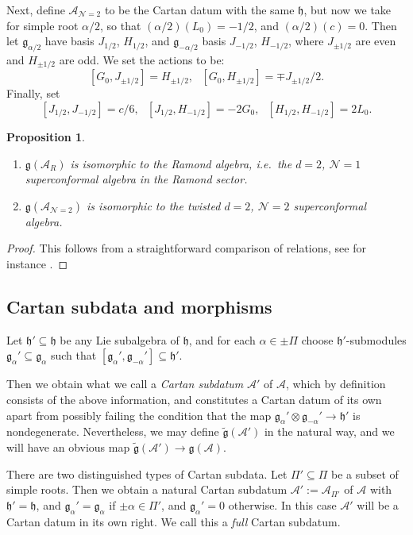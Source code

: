 \documentclass[12pt, a4paper, reqno]{amsart}
\def\AA{\mathcal{A}}
\def\NN{\mathcal{N}}
\def\g{\mathfrak{g}}
\def\h{\mathfrak{h}}
\newtheorem{proposition}{Proposition}
\theoremstyle{definition}
\theoremstyle{definition}
\theoremstyle{definition}
\numberwithin{theorem}{section}
\numberwithin{lemma}{section}
\numberwithin{remark}{section}
\numberwithin{definition}{section}
\numberwithin{corollary}{section}
\numberwithin{proposition}{section}
\numberwithin{example}{section}
\begin{document}
	Next, define $\AA_{\NN=2}$ to be the Cartan datum with the same $\h$,  but now we take for simple root $\alpha/2$, so that $(\alpha/2)(L_0)=-1/2$, and $(\alpha/2)(c)=0$.  Then let $\g_{\alpha/2}$ have basis $J_{1/2}$, $H_{1/2}$, and $\g_{-\alpha/2}$ basis $J_{-1/2}$, $H_{-1/2}$, where $J_{\pm1/2}$ are even and $H_{\pm1/2}$ are odd.  We set the actions to be:
	\[
	[G_0,J_{\pm1/2}]=H_{\pm 1/2}, \ \ \ [G_0,H_{\pm1/2}]=\mp J_{\pm1/2}/2.
	\]
	Finally, set 
	\[
	[J_{1/2},J_{-1/2}]=c/6, \ \ \ [J_{1/2},H_{-1/2}]=-2G_0, \ \ \ [H_{1/2},H_{-1/2}]=2L_0.
	\]
	
	\begin{proposition}
		\begin{enumerate}
			\item $\g(\AA_R)$ is isomorphic to the Ramond algebra, i.e.~the $d=2$, $\NN=1$ superconformal algebra in the Ramond sector.  
			\item $\g(\AA_{\NN=2})$ is isomorphic to the twisted $d=2$, $\NN=2$ superconformal algebra.
		\end{enumerate}

	\end{proposition}
	\begin{proof}
		This follows from a straightforward comparison of relations, see for instance \cite{SS}.
	\end{proof}
	
	
	

	\subsection{Cartan subdata and morphisms}\label{section_subdatum}
	
	Let $\h'\subseteq\h$ be any Lie subalgebra of $\h$, and for each $\alpha\in\pm\Pi$ choose $\h'$-submodules $\g_{\alpha}'\subseteq\g_{\alpha}$ such that $[\g_{\alpha}',\g_{-\alpha}']\subseteq\h'$.  
	
	Then we obtain what we call a \emph{Cartan subdatum} $\AA'$ of $\AA$, which by definition consists of the above information, and constitutes a Cartan datum of its own apart from possibly failing the condition that the map $\g_{\alpha}'\otimes\g_{-\alpha}'\to\h'$ is nondegenerate.  Nevertheless, we may define $\tilde{\g}(\AA')$ in the natural way, and we will have an obvious map $\tilde{\g}(\AA')\to\g(\AA)$.
	
	There are two distinguished types of Cartan subdata.  Let $\Pi'\subseteq\Pi$ be a subset of simple roots.  Then we obtain a natural Cartan subdatum $\AA':=\AA_{\Pi'}$ of $\AA$ with $\h'=\h$, and $\g_{\alpha}'=\g_{\alpha}$ if $\pm\alpha\in\Pi'$, and $\g_{\alpha}'=0$ otherwise.  In this case $\AA'$ will be a Cartan datum in its own right.  We call this a \emph{full} Cartan subdatum.
	
\end{document}
